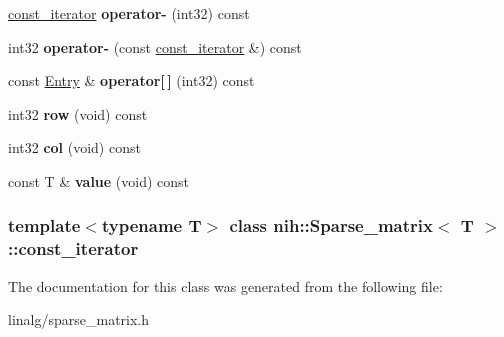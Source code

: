 \begin{DoxyCompactItemize}
\item 
\hypertarget{classnih_1_1_sparse__matrix_1_1const__iterator_a3763f7c8ac155bbcf12926766542fec7}{
\hyperlink{classnih_1_1_sparse__matrix_1_1const__iterator}{const\-\_\-iterator} {\bfseries operator-\/} (int32) const }
\label{classnih_1_1_sparse__matrix_1_1const__iterator_a3763f7c8ac155bbcf12926766542fec7}

\item 
\hypertarget{classnih_1_1_sparse__matrix_1_1const__iterator_ae4b690f384a44a00455e988992963579}{
int32 {\bfseries operator-\/} (const \hyperlink{classnih_1_1_sparse__matrix_1_1const__iterator}{const\-\_\-iterator} \&) const }
\label{classnih_1_1_sparse__matrix_1_1const__iterator_ae4b690f384a44a00455e988992963579}

\item 
\hypertarget{classnih_1_1_sparse__matrix_1_1const__iterator_a8d88fd62df9a8e52d5c966e67b5384ef}{
const \hyperlink{structnih_1_1_sparse__matrix__entry}{\-Entry} \& {\bfseries operator\mbox{[}$\,$\mbox{]}} (int32) const }
\label{classnih_1_1_sparse__matrix_1_1const__iterator_a8d88fd62df9a8e52d5c966e67b5384ef}

\item 
\hypertarget{classnih_1_1_sparse__matrix_1_1const__iterator_a73a4643743c80473a2fc70d9cebad67e}{
int32 {\bfseries row} (void) const }
\label{classnih_1_1_sparse__matrix_1_1const__iterator_a73a4643743c80473a2fc70d9cebad67e}

\item 
\hypertarget{classnih_1_1_sparse__matrix_1_1const__iterator_a08a738d2e1bfe3808120dc033607010a}{
int32 {\bfseries col} (void) const }
\label{classnih_1_1_sparse__matrix_1_1const__iterator_a08a738d2e1bfe3808120dc033607010a}

\item 
\hypertarget{classnih_1_1_sparse__matrix_1_1const__iterator_aeb38203a6cbdf947d9fe3546bd90973a}{
const \-T \& {\bfseries value} (void) const }
\label{classnih_1_1_sparse__matrix_1_1const__iterator_aeb38203a6cbdf947d9fe3546bd90973a}

\end{DoxyCompactItemize}
\subsubsection*{template$<$typename \-T$>$ class nih\-::\-Sparse\-\_\-matrix$<$ T $>$\-::const\-\_\-iterator}



\-The documentation for this class was generated from the following file\-:\begin{DoxyCompactItemize}
\item 
linalg/sparse\-\_\-matrix.\-h\end{DoxyCompactItemize}
